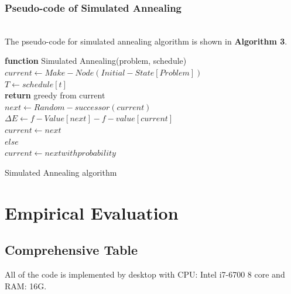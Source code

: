 \subsubsection{Pseudo-code of Simulated Annealing}
\hfill\\
The pseudo-code for simulated annealing algorithm is shown in \textbf{Algorithm 3}.
\begin{algorithm}
 \textbf{function} Simulated Annealing(problem, schedule) \\
 $ current \leftarrow Make-Node(Initial-State[Problem]) $\\
 {
 $ T \leftarrow schedule[t] $\\
 {\textbf{return} greedy from current\\}
 $ next \leftarrow Random-successor(current) $\\
 $ \Delta E \leftarrow f-Value[next]-f-value[current] $\\
 {$ current \leftarrow next $\\}
 $ else $\\
 $ current \leftarrow next with probability $
 }
 
\caption{Simulated Annealing algorithm}
\end{algorithm}


\section{Empirical Evaluation}
\subsection{Comprehensive Table}
All of the code is implemented by desktop with CPU: Intel i7-6700 8 core and RAM: 16G.
